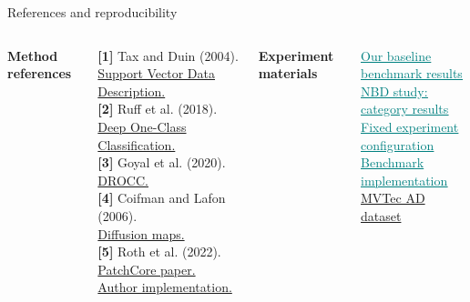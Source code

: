 \documentclass[aspectratio=169,professionalfonts,10pt]{beamer}
\def\phase{NBD}
\newcommand{\head}[1]{\par{\normalsize\bfseries\color{navy}#1}\par\vspace{2pt}}
\newcommand{\gitref}[2]{\href{#1}{\textcolor{teal}{\underline{#2}}}}
\begin{document}
\def\phase{REFERENCES}
\begin{frame}[t]{References and reproducibility}
\small
\begin{columns}[T,onlytextwidth]
\head{Method references}
\textbf{[1]} Tax and Duin (2004).\\
\href{https://doi.org/10.1023/B:MACH.0000008084.60811.49}{Support Vector Data Description.}\\[.20cm]
\textbf{[2]} Ruff et al. (2018).\\
\href{https://proceedings.mlr.press/v80/ruff18a.html}{Deep One-Class Classification.}\\[.20cm]
\textbf{[3]} Goyal et al. (2020).\\
\href{https://proceedings.mlr.press/v119/goyal20c.html}{DROCC.}\\[.20cm]
\textbf{[4]} Coifman and Lafon (2006).\\
\href{https://doi.org/10.1016/j.acha.2006.04.006}{Diffusion maps.}\\[.20cm]
\textbf{[5]} Roth et al. (2022).\\
\href{https://arxiv.org/html/2106.08265v2}{PatchCore paper.}\quad
\href{https://github.com/amazon-science/patchcore-inspection/tree/fcaa92f124fb1ad74a7acf56726decd4b27cbcad}{Author implementation.}
\head{Experiment materials}
\gitref{https://github.com/dathuynh1108/OCC/blob/e01dd960c9bd2ca38dac5dca72efcb5bd3520037/results/reproduction-2026-09-14/native_summary.csv}{Our baseline benchmark results}\\[.22cm]
\gitref{https://github.com/dathuynh1108/OCC/tree/e01dd960c9bd2ca38dac5dca72efcb5bd3520037/results/lean-nbd-5070-20260915}{NBD study: category results}\\[.22cm]
\gitref{https://github.com/dathuynh1108/OCC/blob/e01dd960c9bd2ca38dac5dca72efcb5bd3520037/configs/lean_ad_bd.json}{Fixed experiment configuration}\\[.22cm]
\gitref{https://github.com/dathuynh1108/OCC/tree/e01dd960c9bd2ca38dac5dca72efcb5bd3520037/nbdbench}{Benchmark implementation}\\[.22cm]
\href{https://www.mvtec.com/research-teaching/datasets/mvtec-ad}{MVTec AD dataset}
\end{columns}
\end{frame}
\end{document}
